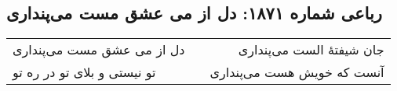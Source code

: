 \begin{center}
\section*{رباعی شماره ۱۸۷۱: دل از می عشق مست می‌پنداری}
\label{sec:1871}
\begin{longtable}{l p{0.5cm} r}
دل از می عشق مست می‌پنداری
&&
جان شیفتهٔ الست می‌پنداری
\\
تو نیستی و بلای تو در ره تو
&&
آنست که خویش هست می‌پنداری
\\
\end{longtable}
\end{center}
